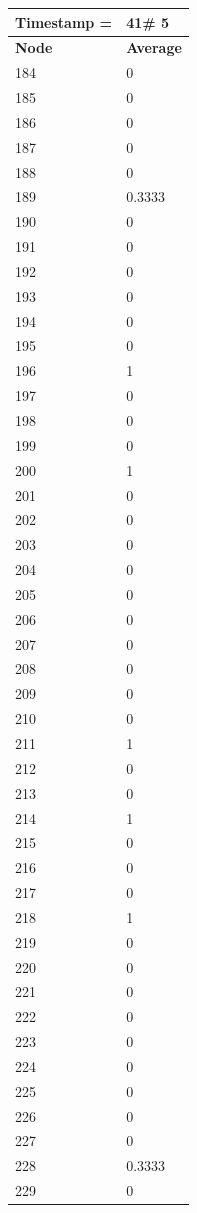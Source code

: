 \begin{tabular}{|l||l|}
\hline
\textbf{Timestamp =} & \textbf{41}\# 5\\\hline
	\textbf{Node} & \textbf{Average} \\ \hline
\hline
	184 & 0 \\ \hline
	185 & 0 \\ \hline
	186 & 0 \\ \hline
	187 & 0 \\ \hline
	188 & 0 \\ \hline
	189 & 0.3333 \\ \hline
	190 & 0 \\ \hline
	191 & 0 \\ \hline
	192 & 0 \\ \hline
	193 & 0 \\ \hline
	194 & 0 \\ \hline
	195 & 0 \\ \hline
	196 & 1 \\ \hline
	197 & 0 \\ \hline
	198 & 0 \\ \hline
	199 & 0 \\ \hline
	200 & 1 \\ \hline
	201 & 0 \\ \hline
	202 & 0 \\ \hline
	203 & 0 \\ \hline
	204 & 0 \\ \hline
	205 & 0 \\ \hline
	206 & 0 \\ \hline
	207 & 0 \\ \hline
	208 & 0 \\ \hline
	209 & 0 \\ \hline
	210 & 0 \\ \hline
	211 & 1 \\ \hline
	212 & 0 \\ \hline
	213 & 0 \\ \hline
	214 & 1 \\ \hline
	215 & 0 \\ \hline
	216 & 0 \\ \hline
	217 & 0 \\ \hline
	218 & 1 \\ \hline
	219 & 0 \\ \hline
	220 & 0 \\ \hline
	221 & 0 \\ \hline
	222 & 0 \\ \hline
	223 & 0 \\ \hline
	224 & 0 \\ \hline
	225 & 0 \\ \hline
	226 & 0 \\ \hline
	227 & 0 \\ \hline
	228 & 0.3333 \\ \hline
	229 & 0 \\ \hline
\end{tabular}
